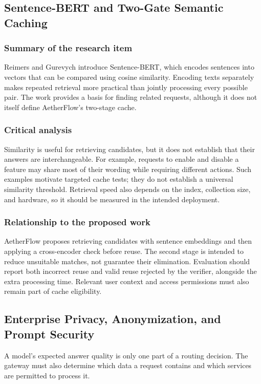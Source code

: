 \subsection{Sentence-BERT and Two-Gate Semantic Caching}
\subsubsection{Summary of the research item}
Reimers and Gurevych \cite{ref:SBERT} introduce Sentence-BERT, which encodes sentences into vectors that can be compared using cosine similarity. Encoding texts separately makes repeated retrieval more practical than jointly processing every possible pair. The work provides a basis for finding related requests, although it does not itself define AetherFlow's two-stage cache.

\subsubsection{Critical analysis}
Similarity is useful for retrieving candidates, but it does not establish that their answers are interchangeable. For example, requests to enable and disable a feature may share most of their wording while requiring different actions. Such examples motivate targeted cache tests; they do not establish a universal similarity threshold. Retrieval speed also depends on the index, collection size, and hardware, so it should be measured in the intended deployment.

\subsubsection{Relationship to the proposed work}
AetherFlow proposes retrieving candidates with sentence embeddings and then applying a cross-encoder check before reuse. The second stage is intended to reduce unsuitable matches, not guarantee their elimination. Evaluation should report both incorrect reuse and valid reuse rejected by the verifier, alongside the extra processing time. Relevant user context and access permissions must also remain part of cache eligibility.

\subsection*{Enterprise Privacy, Anonymization, and Prompt Security}

A model's expected answer quality is only one part of a routing decision. The gateway must also determine which data a request contains and which services are permitted to process it.

